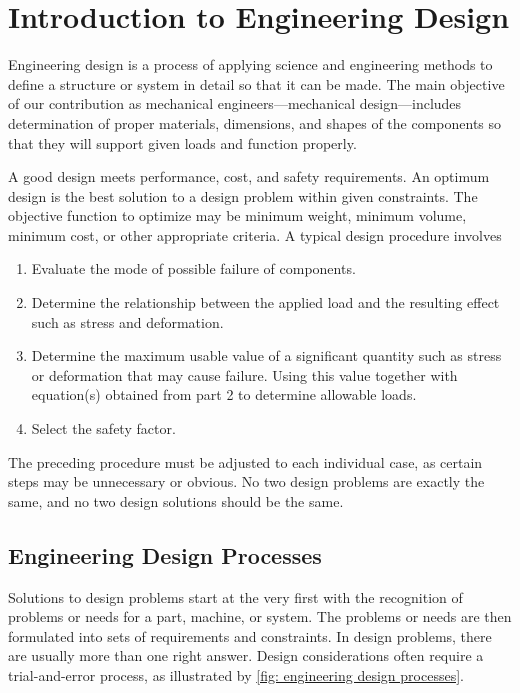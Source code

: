 \documentclass[
10pt,
a4paper,
openany,
svgnames,
]{book}
\begin{document}

\chapter{Introduction to Engineering Design}

Engineering design is a process of applying science and engineering methods to define a structure or system in detail so that it can be made. The main objective of our contribution as mechanical engineers—mechanical design—includes determination of proper materials, dimensions, and shapes of the components so that they will support given loads and function properly.

A good design meets performance, cost, and safety requirements. An optimum design is the best solution to a design problem within given constraints. The objective function to optimize may be minimum weight, minimum volume, minimum cost, or other appropriate criteria. A typical design procedure involves

\begin{enumerate}
  \item Evaluate the mode of possible failure of components.
  \item Determine the relationship between the applied load and the resulting effect such as stress and deformation.
  \item Determine the maximum usable value of a significant quantity such as stress or deformation that may cause failure. Using this value together with equation(s) obtained from part 2 to determine allowable loads.
    \item Select the safety factor.
\end{enumerate}
        
The preceding procedure must be adjusted to each individual case, as certain steps may be unnecessary or obvious. No two design problems are exactly the same, and no two design solutions should be the same.

\section{Engineering Design Processes}

Solutions to design problems start at the very first with the recognition of problems or needs for a part, machine, or system. The problems or needs are then formulated into sets of requirements and constraints. In design problems, there are usually more than one right answer. Design considerations often require a trial-and-error process, as illustrated by \cref{fig: engineering design processes}.
\end{document}
